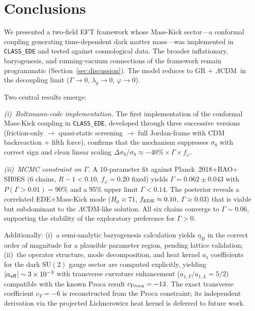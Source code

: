 \documentclass[a4paper,11pt]{article}
\newcommand{\LCDM}{$\Lambda$CDM}
\newcommand{\phif}{\varphi}
\newcommand{\fphi}{f_\varphi}
\newcommand{\lag}{\lambda_g}
\newcommand{\SUt}{\mathrm{SU}(2)}
\newcommand{\etaB}{\eta_B}
\newcommand{\e}[1]{\times 10^{#1}}
\begin{document}
\section{Conclusions}
\label{sec:conclusions}

We presented a two-field EFT framework whose Mass-Kick sector---a conformal coupling generating time-dependent dark matter mass---was implemented in \texttt{CLASS\_EDE} and tested against cosmological data. The broader inflationary, baryogenesis, and running-vacuum connections of the framework remain programmatic (Section~\ref{sec:discussion}). The model reduces to GR $+$ \LCDM\ in the decoupling limit ($\Gamma \to 0$, $\lag \to 0$, $\phif \to 0$).

Two central results emerge:

\textit{(i)~Boltzmann-code implementation.} The first implementation of the conformal Mass-Kick coupling in \texttt{CLASS\_EDE}, developed through three successive versions (friction-only $\to$ quasi-static screening $\to$ full Jordan-frame with CDM backreaction $+$ fifth force), confirms that the mechanism suppresses $\sigma_8$ with correct sign and clean linear scaling $\Delta\sigma_8/\sigma_8 \approx -40\% \times \Gamma \times \fphi$.

\textit{(ii)~MCMC constraint on $\Gamma$.} A 10-parameter fit against Planck~2018$+$BAO$+$SH0ES (6 chains, $R-1 < 0.10$, $\fphi = 0.20$ fixed) yields $\Gamma = 0.062 \pm 0.043$ with $P(\Gamma > 0.01) = 90\%$ and a 95\% upper limit $\Gamma < 0.14$. The posterior reveals a correlated EDE$+$Mass-Kick mode ($H_0 \approx 71$, $f_{\rm EDE} \approx 0.10$, $\Gamma \approx 0.03$) that is viable but subdominant to the \LCDM-like solution. All six chains converge to $\Gamma \sim 0.06$, supporting the stability of the exploratory preference for $\Gamma > 0$.

Additionally: (i)~a semi-analytic baryogenesis calculation yields $\etaB$ in the correct order of magnitude for a plausible parameter region, pending lattice validation; (ii)~the operator structure, mode decomposition, and heat kernel $a_1$ coefficients for the dark $\SUt$ gauge sector are computed explicitly, yielding $|\alpha_{\rm eff}| \sim 3\e{-3}$ with transverse curvature enhancement ($a_{1,T}/a_{1,L} = 5/2$) compatible with the known Proca result $c_{\rm Proca} = -13$. The exact transverse coefficient $c_T = -6$ is reconstructed from the Proca constraint; its independent derivation via the projected Lichnerowicz heat kernel is deferred to future work.
\end{document}

